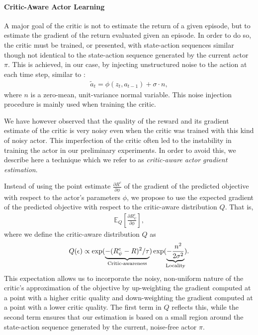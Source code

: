 \paragraph{Critic-Aware Actor Learning}
A major goal of the critic is not to estimate the return of a given episode, but to estimate the gradient of the return evaluated given an episode. In order to do so, the critic must be trained, or presented, with state-action sequences similar though not identical to the state-action sequence generated by the current actor $\pi$. This is achieved, in our case, by injecting unstructured noise to the action at each time step, similar to \citep{heess2015learning}:
\begin{align}
\label{eq:noisy_actor}
\tilde{a}_t = \phi(z_t, a_{t-1}) + \sigma \cdot n,
\end{align}
where $n$ is a zero-mean, unit-variance normal variable. This noise injection procedure is mainly used when training the critic. 

We have however observed that the quality of the reward and its gradient estimate of the critic is very noisy even when the critic was trained with this kind of noisy actor. This imperfection of the critic often led to the instability in training the actor in our preliminary experiments. In order to avoid this, we describe here a technique which we refer to as {\it critic-aware actor gradient estimation}.

Instead of using the point estimate $\frac{\partial R^c}{\partial \phi}$ of the gradient of the predicted objective with respect to the actor's parameters $\phi$, we propose to use the expected gradient of the predicted objective with respect to the critic-aware distribution $Q$. That is,
\begin{align}
\label{eq:critic-aware}
\mathbb{E}_{Q}\left[\frac{\partial R^c_{\psi}}{\partial \phi}\right],
\end{align}
where we define the critic-aware distribution $Q$ as 
\begin{align}
\label{eq:critic-aware-Q}
    Q(\epsilon) \propto \exp(\underbrace{
    -(R^c_{\psi} - R)^2/\tau}_{\text{Critic-awareness}}
    )\exp(\underbrace{-\frac{n^2}{2\sigma^2}}_{\mathclap{\text{Locality}}}).
\end{align}
This expectation allows us to incorporate the noisy, non-uniform nature of the critic's approximation of the objective by up-weighting the gradient computed at a point with a higher critic quality and down-weighting the gradient computed at a point with a lower critic quality. The first term in $Q$ reflects this, while the second term ensures that our estimation is based on a small region around the state-action sequence generated by the current, noise-free actor $\pi$. 

